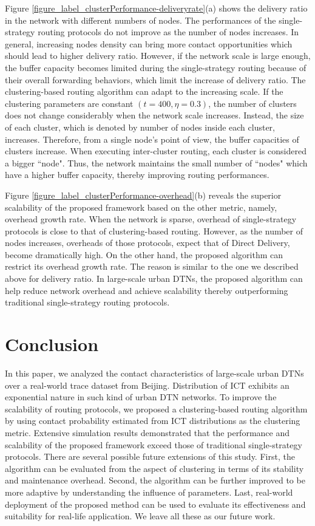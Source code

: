 \documentclass[conference]{IEEEtran}
\begin{document}
Figure \ref{figure_label_clusterPerformance-deliveryrate}(a) shows the delivery ratio in the network with different numbers of nodes. The performances of the single-strategy routing protocols do not improve as the number of nodes increases. In general, increasing nodes density can bring more contact opportunities which should lead to higher delivery ratio. However, if the network scale is large enough, the buffer capacity becomes limited during the single-strategy routing because of their overall forwarding behaviors, which limit the increase of delivery ratio. The clustering-based routing algorithm can adapt to the increasing scale. If the clustering parameters are constant $(t=400,\eta =0.3)$, the number of clusters does not change considerably when the network scale increases. Instead, the size of each cluster, which is denoted by number of nodes inside each cluster, increases. Therefore, from a single node's point of view, the buffer capacities of clusters increase. When executing inter-cluster routing, each cluster is considered a bigger ``node". Thus, the network maintains the small number of ``nodes" which have a higher buffer capacity, thereby improving routing performances.

Figure \ref{figure_label_clusterPerformance-overhead}(b) reveals the superior scalability of the proposed framework based on the other metric, namely, overhead growth rate. When the network is sparse, overhead of single-strategy protocols is close to that of clustering-based routing. However, as the number of nodes increases, overheads of those protocols, expect that of Direct Delivery, become dramatically high. On the other hand, the proposed algorithm can restrict its overhead growth rate. The reason is similar to the one we described above for delivery ratio. In large-scale urban DTNs, the proposed algorithm can help reduce network overhead and achieve scalability thereby outperforming traditional single-strategy routing protocols.

\section{Conclusion}
\label{Section6_conclusions}

In this paper, we analyzed the contact characteristics of large-scale urban DTNs over a real-world trace dataset from Beijing.  Distribution of ICT exhibits an exponential nature in such kind of urban DTN networks. To improve the scalability of routing protocols, we proposed a clustering-based routing algorithm by using contact probability estimated from ICT distributions as the clustering metric. Extensive simulation results demonstrated that the performance and scalability of the proposed framework exceed those of traditional single-strategy protocols. There are several possible future extensions of this study. First, the algorithm can be evaluated from the aspect of clustering in terms of its stability and maintenance overhead. Second, the algorithm can be further improved to be more adaptive by understanding the influence of parameters. Last, real-world deployment of the proposed method can be used to evaluate its effectiveness and suitability for real-life application. We leave all these as our future work.
\end{document}
